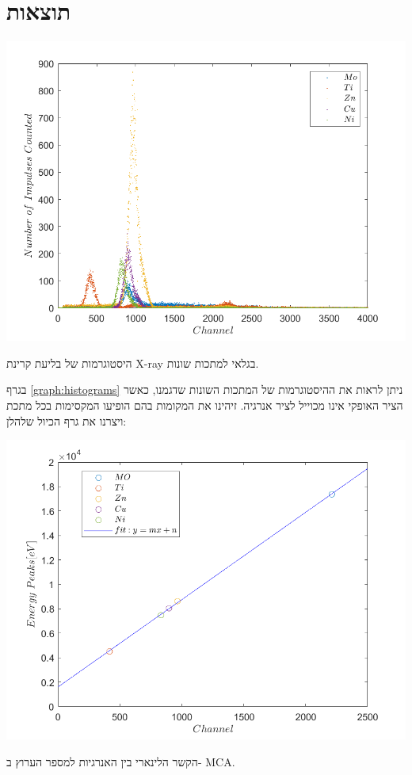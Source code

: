 \documentclass{article}
\begin{document}
\section{תוצאות}

\begin{graph}
    \centering
    \includegraphics[width=\textwidth]{spec.png}
    \caption{
    היסטוגרמות של בליעת קרינת
    \textenglish{X-ray}
    בגלאי למתכות שונות.
    }
    \label{graph:histograms}
\end{graph}

בגרף
\ref{graph:histograms}
ניתן לראות את ההיסטוגרמות של המתכות השונות שדגמנו, כאשר הציר האופקי אינו מכוייל לציר אנרגיה. זיהינו את המקומות בהם הופיעו המקסימות בכל מתכת ויצרנו את גרף הכיול שלהלן:

\begin{graph}[ht!]
    \centering
    \includegraphics[width=\textwidth]{calibration.png}
    \caption{
    הקשר הלינארי בין האנרגיות למספר הערוץ ב-
    \textenglish{MCA}.
    }
    \label{graph:MCA-energies}
\end{graph}
\end{document}
